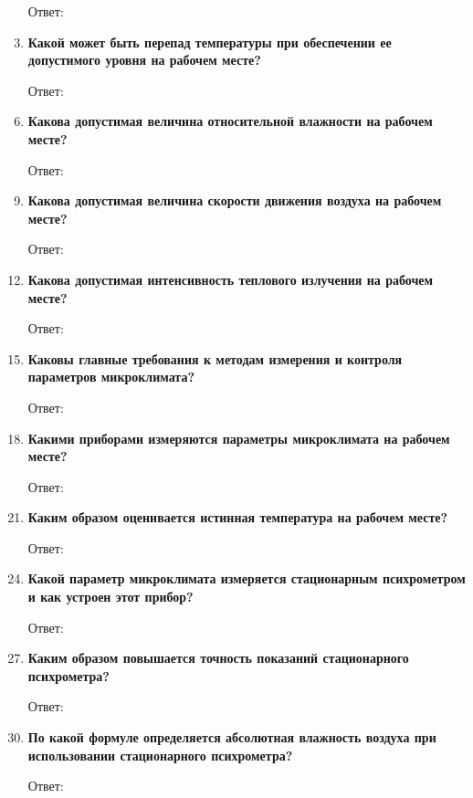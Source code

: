 \documentclass[a5paper, 12dd, twoside]{article}
\begin{document}
\begin{enumerate}
    \item [Ответ:]
    \item []
    \item {\bfseries Какой может быть перепад температуры при обеспечении ее допустимого уровня на рабочем месте?}
    \item [Ответ:]
    \item []
    \item {\bfseries Какова допустимая величина относительной влажности на рабочем месте?}
    \item [Ответ:]
    \item []
    \item {\bfseries Какова допустимая величина скорости движения воздуха на рабочем месте?}
    \item [Ответ:]
    \item []
    \item {\bfseries Какова допустимая интенсивность теплового излучения на рабочем месте?}
    \item [Ответ:]
    \item []
    \item {\bfseries Каковы главные требования к методам измерения и контроля параметров микроклимата?}
    \item [Ответ:]
    \item []
    \item {\bfseries Какими приборами измеряются параметры микроклимата на рабочем месте?}
    \item [Ответ:]
    \item []
    \item {\bfseries Каким образом оценивается истинная температура на рабочем месте?}
    \item [Ответ:]
    \item []
    \item {\bfseries Какой параметр микроклимата измеряется стационарным психрометром и как устроен этот прибор?}
    \item [Ответ:]
    \item []
    \item {\bfseries Каким образом повышается точность показаний стационарного психрометра?}
    \item [Ответ:]
    \item []
    \item {\bfseries По какой формуле определяется абсолютная влажность воздуха при использовании стационарного психрометра?}
    \item [Ответ:]
    \item []

\end{enumerate}
\end{document}
